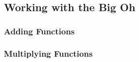 \subsection{Working with the Big Oh}

\subsubsection{Adding Functions}

\subsubsection{Multiplying Functions}